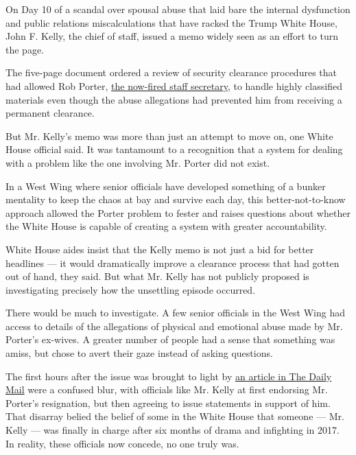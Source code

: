 On Day 10 of a scandal over spousal abuse that laid bare the internal
dysfunction and public relations miscalculations that have racked the
Trump White House, John F. Kelly, the chief of staff, issued a memo
widely seen as an effort to turn the page.

The five-page document ordered a review of security clearance procedures
that had allowed Rob Porter,
\href{https://www.nytimes3xbfgragh.onion/2018/02/07/us/politics/rob-porter-resigns-abuse-white-house-staff-secretary.html}{the
now-fired staff secretary}, to handle highly classified materials even
though the abuse allegations had prevented him from receiving a
permanent clearance.

But Mr. Kelly's memo was more than just an attempt to move on, one White
House official said. It was tantamount to a recognition that a system
for dealing with a problem like the one involving Mr. Porter did not
exist.

In a West Wing where senior officials have developed something of a
bunker mentality to keep the chaos at bay and survive each day, this
better-not-to-know approach allowed the Porter problem to fester and
raises questions about whether the White House is capable of creating a
system with greater accountability.

White House aides insist that the Kelly memo is not just a bid for
better headlines --- it would dramatically improve a clearance process
that had gotten out of hand, they said. But what Mr. Kelly has not
publicly proposed is investigating precisely how the unsettling episode
occurred.

There would be much to investigate. A few senior officials in the West
Wing had access to details of the allegations of physical and emotional
abuse made by Mr. Porter's ex-wives. A greater number of people had a
sense that something was amiss, but chose to avert their gaze instead of
asking questions.

The first hours after the issue was brought to light by
\href{http://www.dailymail.co.uk/news/article-5359731/Ex-wife-Rob-Porter-Trumps-secretary-tells-marriage.html}{an
article in The Daily Mail} were a confused blur, with officials like Mr.
Kelly at first endorsing Mr. Porter's resignation, but then agreeing to
issue statements in support of him. That disarray belied the belief of
some in the White House that someone --- Mr. Kelly --- was finally in
charge after six months of drama and infighting in 2017. In reality,
these officials now concede, no one truly was.

